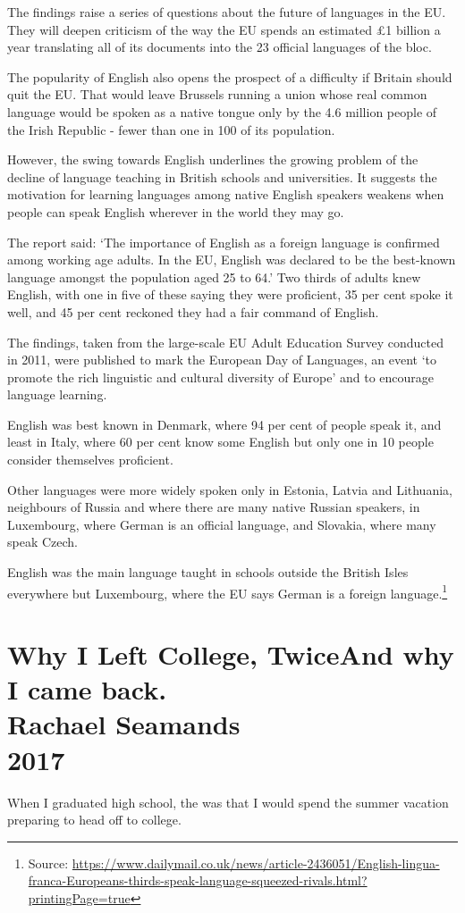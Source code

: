 \documentclass[10pt,a4paper]{book}
\newcommand{\source}[1]{\footnote{Source: \href{#1}{#1}}}
\newcommand{\glos}[3]{\dotuline{#1}\marginpar{\scriptsize\textit{#3} #2}}
\newcommand{\subtitle}[1]{\vspace{10pt}\newline\normalsize\plantin #1}
\newcommand{\newentry}[3]{
		\begingroup
		\chapter*{
		\nolinenumbers
		\plantinc\color{hgblue} #1\\\Large\normalfont\color{black} #2\\\normalsize #3
		}
		\endgroup
	}
\begin{document}
The findings raise a series of questions about the future of languages in the EU. They will deepen criticism of the way the EU spends an estimated £1 billion a year translating all of its documents into the 23 official languages of the bloc.

The popularity of English also opens the prospect of a difficulty if Britain should quit the EU. That would leave Brussels running a union whose real common language would be spoken as a native tongue only by the 4.6 million people of the Irish Republic - fewer than one in 100 of its population.

However, the swing towards English underlines the growing problem of the decline of language teaching in British schools and universities. It suggests the motivation for learning languages among native English speakers weakens when people can speak English wherever in the world they may go.

The report said: ‘The importance of English as a foreign language is confirmed among working age adults. In the EU, English was declared to be the best-known language amongst the population aged 25 to 64.’ Two thirds of adults knew English, with one in five of these saying they were proficient, 35 per cent spoke it well, and 45 per cent reckoned they had a fair command of English.

The findings, taken from the large-scale EU Adult Education Survey conducted in 2011, were published to mark the European Day of Languages, an event ‘to promote the rich linguistic and cultural diversity of Europe’ and to encourage language learning.

English was best known in Denmark, where 94 per cent of people speak it, and least in Italy, where 60 per cent know some English but only one in 10 people consider themselves proficient.

Other languages were more widely spoken only in Estonia, Latvia and Lithuania, neighbours of Russia and where there are many native Russian speakers, in Luxembourg, where German is an official language, and Slovakia, where many speak Czech.

English was the main language taught in schools outside the British Isles everywhere but Luxembourg, where the EU says German is a foreign language.\source{https://www.dailymail.co.uk/news/article-2436051/English-lingua-franca-Europeans-thirds-speak-language-squeezed-rivals.html?printingPage=true}


\newentry{Why I Left College, Twice\subtitle{And why I came back.}}{Rachael Seamands}{2017}
\linenumbers \noindent When I graduated high school, the \glos{assumption}{antagelse}{sb.} was that I would spend the summer vacation preparing to head off to college.
\end{document}
